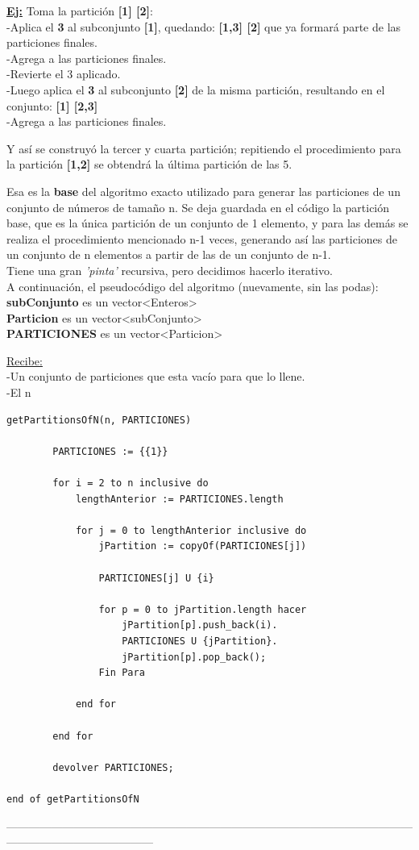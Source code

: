 \documentclass[10pt,a4paper]{article}
\begin{document}
\begin{enumerate}
\indent \textbf{\underline{Ej:}} Toma la partición \textbf{[1] [2]}:\\
\indent -Aplica el \textbf{3} al subconjunto \textbf{[1]}, quedando: \textbf{[1,3] [2]} que ya formará parte de las particiones finales.\\
\indent -Agrega a las particiones finales.\\
\indent -Revierte el 3 aplicado.\\
\indent -Luego aplica el \textbf{3} al subconjunto \textbf{[2]} de la misma partición, resultando en el conjunto: \textbf{[1] [2,3]}\\
\indent -Agrega a las particiones finales.

Y así se construyó la tercer y cuarta partición; repitiendo el procedimiento para la partición \textbf{[1,2]} se obtendrá la última partición de las 5.\\
\end{enumerate}
Esa es la \textbf{base} del algoritmo exacto utilizado para generar las particiones de un conjunto de números de tamaño n. Se deja guardada en el código la partición base, que es la única partición de un conjunto de 1 elemento, y para las demás se realiza el procedimiento mencionado n-1 veces, generando así las particiones de un conjunto de n elementos a partir de las de un conjunto de n-1.\\
Tiene una gran \textit{'pinta'} recursiva, pero decidimos hacerlo iterativo.\\

A continuación, el pseudocódigo del algoritmo (nuevamente, sin las podas):\\

\textbf{subConjunto} es un vector\textless Enteros\textgreater \\
\indent \textbf{Particion} es un vector\textless subConjunto\textgreater\\
\indent \textbf{PARTICIONES} es un vector\textless Particion\textgreater

\newpage
\underline{Recibe:}\\
-Un conjunto de particiones que esta vacío para que lo llene.\\
-El n
\begin{lstlisting}
getPartitionsOfN(n, PARTICIONES)

		PARTICIONES := {{1}}
	
		for i = 2 to n inclusive do
			lengthAnterior := PARTICIONES.length

			for j = 0 to lengthAnterior inclusive do
				jPartition := copyOf(PARTICIONES[j])

				PARTICIONES[j] U {i}			
					
				for p = 0 to jPartition.length hacer
					jPartition[p].push_back(i).
					PARTICIONES U {jPartition}.
					jPartition[p].pop_back();
				Fin Para
			
			end for
	
		end for

		devolver PARTICIONES;

end of getPartitionsOfN
\end{lstlisting}
---------------------------------------------------------------------------------------------------------------------------------------------------
\end{document}
